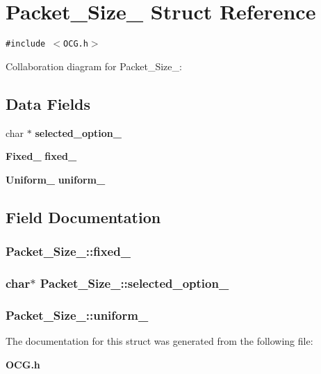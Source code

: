 \section{Packet\_\-Size\_\- Struct Reference}
\label{structPacket__Size__}
{\tt \#include $<$OCG.h$>$}

Collaboration diagram for Packet\_\-Size\_\-:\subsection*{Data Fields}
\begin{CompactItemize}
\item 
char $\ast$ {\bf selected\_\-option\_\-}
\item 
{\bf Fixed\_\-} {\bf fixed\_\-}
\item 
{\bf Uniform\_\-} {\bf uniform\_\-}
\end{CompactItemize}


\subsection{Field Documentation}
\subsubsection[{fixed\_\-}]{ {\bf Packet\_\-Size\_\-::fixed\_\-}}\label{structPacket__Size___4d58fd0f297063a6aaabd337f96765d1}


\subsubsection[{selected\_\-option\_\-}]{\setlength{\rightskip}{0pt plus 5cm}char$\ast$ {\bf Packet\_\-Size\_\-::selected\_\-option\_\-}}\label{structPacket__Size___e60c5986700a19162b85efdbccf46c52}


\subsubsection[{uniform\_\-}]{ {\bf Packet\_\-Size\_\-::uniform\_\-}}\label{structPacket__Size___c0f4d5186a4e40e8e0144b1411e3f813}




The documentation for this struct was generated from the following file:\begin{CompactItemize}
\item 
{\bf OCG.h}\end{CompactItemize}
